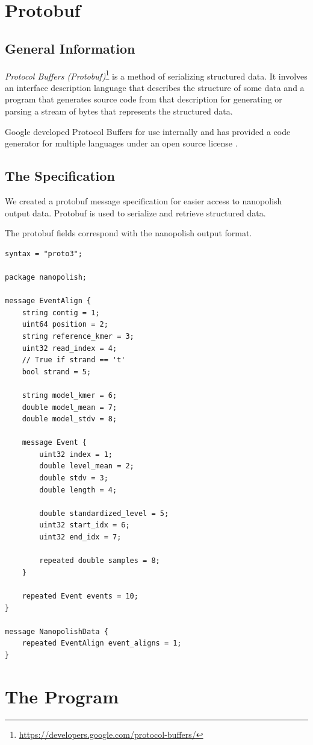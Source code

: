 \documentclass[times, utf, seminar]{fer}
\begin{document}
\chapter{Protobuf}
\section{General Information}
\textit{Protocol Buffers (Protobuf)}\footnote{\url{https://developers.google.com/protocol-buffers/}} is a method of serializing structured data. It involves an interface description language that describes the structure of some data and a program that generates source code from that description for generating or parsing a stream of bytes that represents the structured data.

Google developed Protocol Buffers for use internally and has provided a code generator for multiple languages under an open source license \citep{protobuf}.
\section{The Specification}
We created a protobuf message specification for easier access to nanopolish 
output data. Protobuf is used to serialize and retrieve structured data.

The protobuf fields correspond with the nanopolish output format. 

\begin{lstlisting}
syntax = "proto3";

package nanopolish;

message EventAlign {
	string contig = 1;
	uint64 position = 2;
	string reference_kmer = 3;
	uint32 read_index = 4;
	// True if strand == 't'
	bool strand = 5;

	string model_kmer = 6;
	double model_mean = 7;
	double model_stdv = 8;

	message Event {
		uint32 index = 1;
		double level_mean = 2;
		double stdv = 3;
		double length = 4;

		double standardized_level = 5;
		uint32 start_idx = 6;
		uint32 end_idx = 7;

		repeated double samples = 8;
	}

	repeated Event events = 10;
}

message NanopolishData {
	repeated EventAlign event_aligns = 1;
}
\end{lstlisting}


\chapter{The Program}
\end{document}
